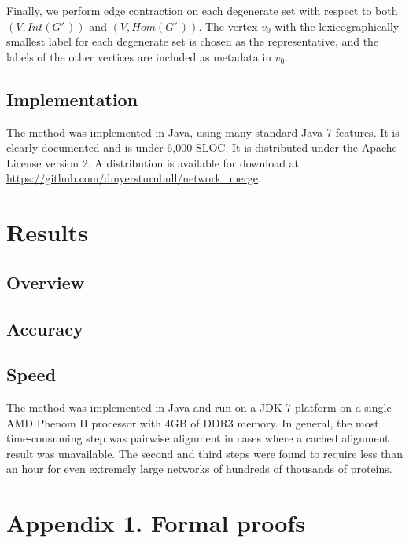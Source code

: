 \documentclass[12pt,twoside]{article}
\def\NI{\noindent}
\begin{document}
\NI Finally, we perform edge contraction on each degenerate set with respect to both $(V,Int(G'\,\!))$ and $(V,Hom(G'\,\!))$. The vertex $v_0$ with the lexicographically smallest label for each degenerate set is chosen as the representative, and the labels of the other vertices are included as metadata in $v_0$.

\subsection{Implementation}

\NI The method was implemented in Java, using many standard Java 7 features. It is clearly documented and is under 6,000 SLOC. It is distributed under the Apache License version 2. A distribution is available for download at \url{https://github.com/dmyersturnbull/network_merge}.

\section{Results}

\NI 

\subsection{Overview}

\subsection{Accuracy}

\subsection{Speed}

\NI The method was implemented in Java and run on a JDK 7 platform on a single AMD Phenom II processor with 4GB of DDR3 memory. In general, the most time-consuming step was pairwise alignment in cases where a cached alignment result was unavailable. The second and third steps were found to require less than an hour for even extremely large networks of hundreds of thousands of proteins.

\section{Appendix 1. Formal proofs}



\end{document}
